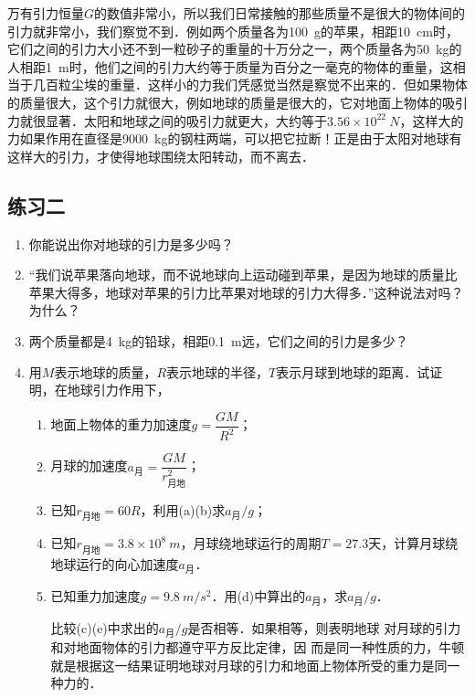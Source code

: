 万有引力恒量$G$的数值非常小，所以我们日常接触的那些质量不是很大的物体间的引力就非常小，我们察觉不到．例如两个质量各为\SI{100}{g}的苹果，相距\SI{10}{cm}时，它们之间的引力大小还不到一粒砂子的重量的十万分之一，两个质量各为\SI{50}{kg}的人相距\SI{1}{m}时，他们之间的引力大约等于质量为百分之一毫克的物体的重量，这相当于几百粒尘埃的重量．这样小的力我们凭感觉当然是察觉不出来的．但如果物体的质量很大，这个引力就很大，例如地球的质量是很大的，它对地面上物体的吸引力就很显著．太阳和地球之间的吸引力就更大，大约等于$3.56\times 10^{22}~\si{N}$，这样大的力如果作用在直径是\SI{9000}{kg}的钢柱两端，可以把它拉断！正是由于太阳对地球有这样大的引力，才使得地球围绕太阳转动，而不离去．

\subsection*{练习二}
\begin{enumerate}
	\item 你能说出你对地球的引力是多少吗？
	\item “我们说苹果落向地球，而不说地球向上运动碰到苹果，是因为地球的质量比苹果大得多，地球对苹果的引力比苹果对地球的引力大得多．”这种说法对吗？为什么？
	\item 两个质量都是\SI{4}{kg}的铅球，相距\SI{0.1}{m}远，它们之间的引力是多少？
	\item 用$M$表示地球的质量，$R$表示地球的半径，$T$表示月球到地球的距离．试证明，在地球引力作用下，
	      \begin{enumerate}
		      \item 地面上物体的重力加速度$g=\dfrac{GM}{R^2}$；
		      \item 月球的加速度$a_{\text{月}}=\dfrac{GM}{r^2_{\text{月地}}}$；
		      \item 已知$r_{\text{月地}}=60R$，利用(a)(b)求$a_{\text{月}}/g$；
		      \item 已知$r_{\text{月地}}=3.8\times 10^8~\si{m}$，月球绕地球运行的周期$T=27.3$天，计算月球绕地球运行的向心加速度$a_{\text{月}}$．
		      \item 已知重力加速度$g=\SI{9.8}{m/s^2}$．用(d)中算出的$a_{\text{月}}$，求$a_{\text{月}}/g$．

		            比较(c)(e)中求出的$a_{\text{月}}/g$是否相等．如果相等，则表明地球
		            对月球的引力和对地面物体的引力都遵守平方反比定律，因
		            而是同一种性质的力，牛顿就是根据这一结果证明地球对月球的引力和地面上物体所受的重力是同一种力的．
	      \end{enumerate}
\end{enumerate}

